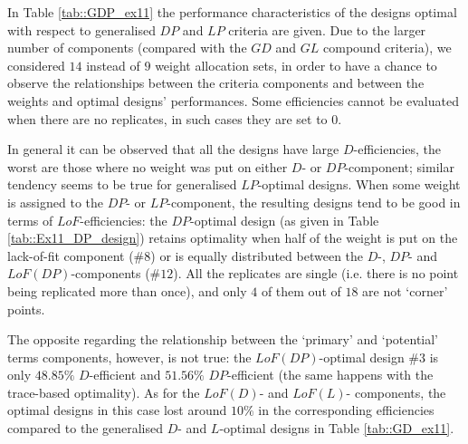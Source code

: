 In Table \ref{tab::GDP_ex11} the performance characteristics of the designs optimal with respect to generalised $DP$ and $LP$ criteria are given. Due to the larger number of components (compared with the $GD$ and $GL$ compound criteria), we considered $14$ instead of $9$ weight allocation sets, in order to have a chance to observe the relationships between the criteria components and between the weights and optimal designs' performances. Some efficiencies cannot be evaluated when there are no replicates, in such cases they are set to $0$.

In general it can be observed that all the designs have large $D$-efficiencies, the worst are those where no weight was put on either $D$- or $DP$-component; similar tendency seems to be true for generalised $LP$-optimal designs. When some weight is assigned to the $DP$- or $LP$-component, the resulting designs tend to be good in terms of $LoF$-efficiencies: the $DP$-optimal design (as given in Table \ref{tab::Ex11_DP_design}) retains optimality when half of the weight is put on the lack-of-fit component (\#$8$) or is equally distributed between the $D$-, $DP$- and $LoF(DP)$-components (\#$12$). All the replicates are single (i.e. there is no point being replicated more than once), and only $4$ of them out of $18$ are not `corner' points.

The opposite regarding the relationship between the `primary' and `potential' terms components, however, is not true: the $LoF(DP)$-optimal design \#$3$ is only $48.85\%$ $D$-efficient and $51.56\%$ $DP$-efficient (the same happens with the trace-based optimality). As for the $LoF(D)$- and $LoF(L)$- components, the optimal designs in this case lost around $10\%$ in the corresponding efficiencies compared to the generalised $D$- and $L$-optimal designs in Table \ref{tab::GD_ex11}.  

